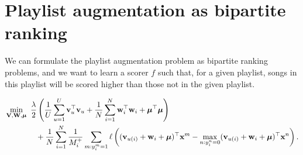 \section{Playlist augmentation as bipartite ranking}

We can formulate the playlist augmentation problem as bipartite ranking problems, 
and we want to learn a scorer $f$ such that, for a given playlist, 
songs in this playlist will be scored higher than those not in the given playlist.

\begin{equation}
\label{eq:primal}
\begin{aligned}
&\min_{\mathbf{V}, \mathbf{W}, \bm{\mu}} \ \frac{\lambda}{2} \left( \frac{1}{U} \sum_{u=1}^U \mathbf{v}_u^\top \mathbf{v}_u 
     + \frac{1}{N} \sum_{i=1}^N \mathbf{w}_i^\top \mathbf{w}_i + \bm{\mu}^\top \bm{\mu} \right) \\
& \hspace{4em}
     + \frac{1}{N} \sum_{i=1}^N \frac{1}{M_i^+} \sum_{m: y_i^m = 1} \ell \left( (\mathbf{v}_{u(i)} + \mathbf{w}_i + \bm{\mu})^\top \mathbf{x}^m 
     - \max_{n: y_i^n = 0} (\mathbf{v}_{u(i)} + \mathbf{w}_i + \bm{\mu})^\top \mathbf{x}^n \right).
\end{aligned}
\end{equation}


